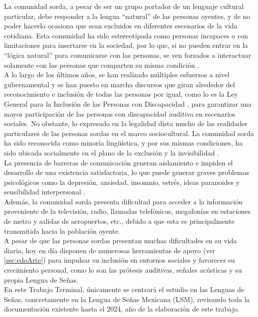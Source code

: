 La comunidad sorda, a pesar de ser un grupo portador de un lenguaje cultural particular, debe responder a la lengua “natural” de las personas oyentes, y de no poder hacerlo ocasiona que sean excluidos en diferentes escenarios de la vida cotidiana. Esta comunidad ha sido estereotipada como personas incapaces o con limitaciones para insertarse en la sociedad, por lo que, si no pueden entrar en la “lógica natural” para comunicarse con las personas, se ven forzados a interactuar solamente con las personas que comparten su misma condición \cite{ref32}.\\

A lo largo de los últimos años, se han realizado múltiples esfuerzos a nivel gubernamental y se han puesto en marcha discursos que giran alrededor del reconocimiento e inclusión de todas las personas por igual, como lo es la Ley General para la Inclusión de las Personas con Discapacidad \cite{ref37}, para garantizar una mayor participación de las personas con discapacidad auditiva en escenarios sociales. No obstante, lo expresado en la legalidad dista mucho de las realidades particulares de las personas sordas en el marco sociocultural. La comunidad sorda ha sido reconocida como minoría lingüística, y por sus mismas condiciones, ha sido ubicada socialmente en el plano de la exclusión y la invisibilidad \cite{ref32}. \\ 

La presencia de barreras de comunicación generan aislamiento e impiden el desarrollo de una existencia satisfactoria, lo que puede generar graves problemas psicológicos como la depresión, ansiedad, insomnio, estrés, ideas paranoides y sensibilidad interpersonal \cite{ref27}.\\

Además, la comunidad sorda presenta dificultad para acceder a la información proveniente de la televisión, radio, llamadas telefónicas, megafonías en estaciones de metro y salidas de aeropuertos, etc., debido a que esta es principalmente transmitida hacia la población oyente.\\

A pesar de que las personas sordas presentan muchas dificultades en su vida diaria, hoy en día disponen de numerosas herramientas de apoyo (ver \autoref{sec:edoArte}) para impulsar su inclusión en entornos sociales y favorecer su crecimiento personal, como lo son las prótesis auditivas, señales acústicas y su propia Lengua de Señas. \\

En este Trabajo Terminal, únicamente se centrará el estudio en las Lenguas de Señas, concretamente en la Lengua de Señas Mexicana (LSM), revisando toda la documentación existente hasta el 2024, año de la elaboración de este trabajo.\\

